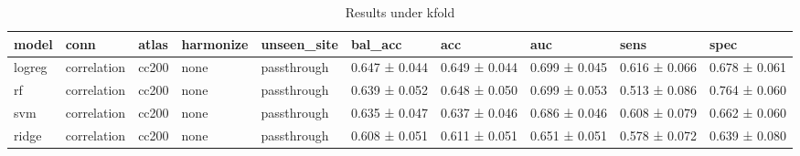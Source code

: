 \begin{table}
\caption{Results under kfold}
\label{tab:kfold}
\begin{tabular}{llllllllll}
\toprule
model & conn & atlas & harmonize & unseen\_site & bal\_acc & acc & auc & sens & spec \\
\midrule
logreg & correlation & cc200 & none & passthrough & 0.647 ± 0.044 & 0.649 ± 0.044 & 0.699 ± 0.045 & 0.616 ± 0.066 & 0.678 ± 0.061 \\
rf & correlation & cc200 & none & passthrough & 0.639 ± 0.052 & 0.648 ± 0.050 & 0.699 ± 0.053 & 0.513 ± 0.086 & 0.764 ± 0.060 \\
svm & correlation & cc200 & none & passthrough & 0.635 ± 0.047 & 0.637 ± 0.046 & 0.686 ± 0.046 & 0.608 ± 0.079 & 0.662 ± 0.060 \\
ridge & correlation & cc200 & none & passthrough & 0.608 ± 0.051 & 0.611 ± 0.051 & 0.651 ± 0.051 & 0.578 ± 0.072 & 0.639 ± 0.080 \\
\bottomrule
\end{tabular}
\end{table}
